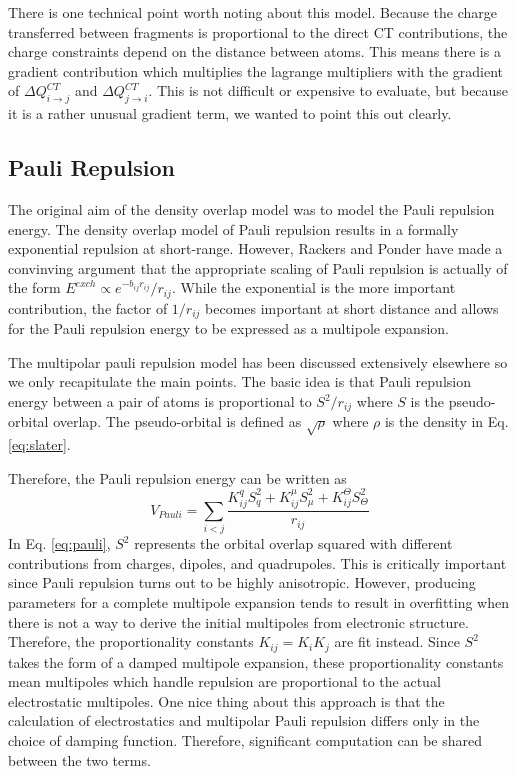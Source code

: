 \documentclass[journal=jacsat,manuscript=article]{achemso}
\begin{document}
There is one technical point worth noting about this model. Because the
charge transferred between fragments is proportional to the direct CT contributions,
the charge constraints depend on the distance between atoms. This means there
is a gradient contribution which multiplies the lagrange multipliers
with the gradient of $\Delta Q^{CT}_{i\rightarrow j}$ and $\Delta Q^{CT}_{j\rightarrow i}$.
This is not difficult or expensive to evaluate, but because it is a rather
unusual gradient term, we wanted to point this out clearly.

\subsection*{Pauli Repulsion}
The original aim of the density overlap model was to model the
Pauli repulsion energy.\cite{wallqvist1989new,wheatley1990overlap,gordon1996approximate}
The density overlap model of Pauli repulsion results in a formally exponential
repulsion at short-range.
However, Rackers and Ponder have made a convinving argument that the appropriate
scaling of Pauli repulsion is actually of the form $E^{exch}\propto e^{-b_{ij}r_{ij}}/r_{ij}$.\cite{rackers2019classical,rackers2021polarizable}
While the exponential is the more important contribution, the factor of $1/r_{ij}$
becomes important at short distance and allows for the Pauli repulsion energy
to be expressed as a multipole expansion.

The multipolar pauli repulsion model has been discussed extensively elsewhere\cite{rackers2019classical}
so we only recapitulate the main points. The basic idea is that Pauli repulsion energy
between a pair of atoms is proportional to $S^2/r_{ij}$ where $S$ is the pseudo-orbital
overlap. The pseudo-orbital is defined as $\sqrt{\rho}$ where $\rho$ is the density in Eq. \ref{eq:slater}.

Therefore, the Pauli repulsion energy can be written as
\begin{equation}
  V_{Pauli}=\sum_{i<j}\frac{K_{ij}^q S^2_{q}+K_{ij}^\mu S^2_{\mu}+K_{ij}^\Theta S^2_{\Theta}}{r_{ij}}
\label{eq:pauli}
\end{equation}
\noindent
In Eq. \ref{eq:pauli}, $S^2$ represents the orbital overlap squared with different contributions
from charges, dipoles, and quadrupoles. This is critically important since Pauli repulsion
turns out to be highly anisotropic. However, producing parameters for a complete multipole expansion
tends to result in overfitting when there is not a way to derive the initial multipoles
from electronic structure. Therefore, the proportionality constants $K_{ij}=K_iK_j$ are fit instead.
Since $S^2$ takes the form of a damped multipole expansion\cite{rackers2019classical}, these proportionality
constants mean multipoles which handle repulsion are proportional to the actual electrostatic
multipoles. One nice thing about this approach is that the calculation of electrostatics and
multipolar Pauli repulsion differs only in the choice of damping function. Therefore, significant
computation can be shared between the two terms.
\end{document}

